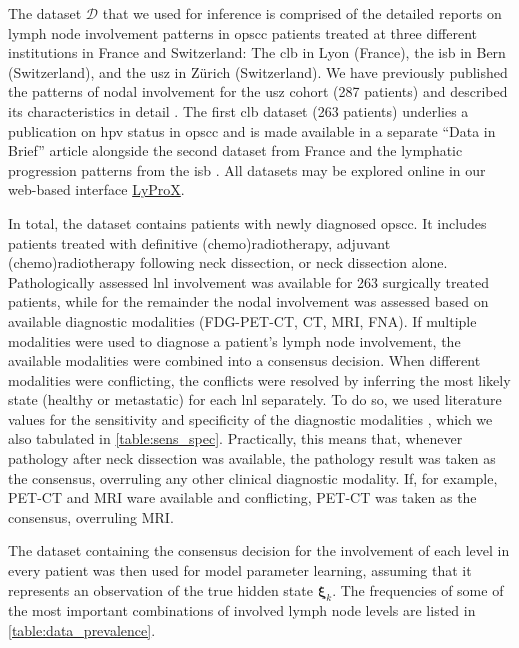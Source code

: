 \documentclass[twocolumn]{aastex631}
\begin{document}
The dataset $\boldsymbol{\mathcal{D}}$ that we used for inference is comprised of the detailed reports on lymph node involvement patterns in \gls{opscc} patients treated at three different institutions in France and Switzerland: The \gls{clb} in Lyon (France), the \gls{isb} in Bern (Switzerland), and the \gls{usz} in Zürich (Switzerland). We have previously published the patterns of nodal involvement for the \gls{usz} cohort (287 patients) \citep{ludwig_dataset_2022,ludwig_lydata_2023} and described its characteristics in detail \citep{ludwig_detailed_2022}. The first \gls{clb} dataset (263 patients) \citep{ludwig_lydata_2022} underlies a publication on \gls{hpv} status in \gls{opscc} \citep{bauwens_prevalence_2021} and is made available in a separate ``Data in Brief'' article alongside the second dataset from France \citep{ludwig_lydata_2023-2} and the lymphatic progression patterns from the \gls{isb} \citep{ludwig_lydata_2023-1,ludwig_multi-centric_2023}. All datasets may be explored online in our web-based interface \href{https://lyprox.org}{LyProX}.

In total, the dataset contains patients with newly diagnosed \gls{opscc}. It includes patients treated with definitive (chemo)radiotherapy, adjuvant (chemo)radiotherapy following neck dissection, or neck dissection alone. Pathologically assessed \gls{lnl} involvement was available for 263 surgically treated patients, while for the remainder the nodal involvement was assessed based on available diagnostic modalities (FDG-PET-CT, CT, MRI, FNA). If multiple modalities were used to diagnose a patient's lymph node involvement, the available modalities were combined into a consensus decision. When different modalities were conflicting, the conflicts were resolved by inferring the most likely state (healthy or metastatic) for each \gls{lnl} separately. To do so, we used literature values for the sensitivity and specificity of the diagnostic modalities \citep{de_bondt_Detection_2007,kyzas_18f-fluorodeoxyglucose_2008}, which we also tabulated in \autoref{table:sens_spec}. Practically, this means that, whenever pathology after neck dissection was available, the pathology result was taken as the consensus, overruling any other clinical diagnostic modality. If, for example, PET-CT and MRI ware available and conflicting, PET-CT was taken as the consensus, overruling MRI.

The dataset containing the consensus decision for the involvement of each level in every patient was then used for model parameter learning, assuming that it represents an observation of the true hidden state $\boldsymbol{\xi}_k$. The frequencies of some of the most important combinations of involved lymph node levels are listed in \autoref{table:data_prevalence}.
\end{document}
